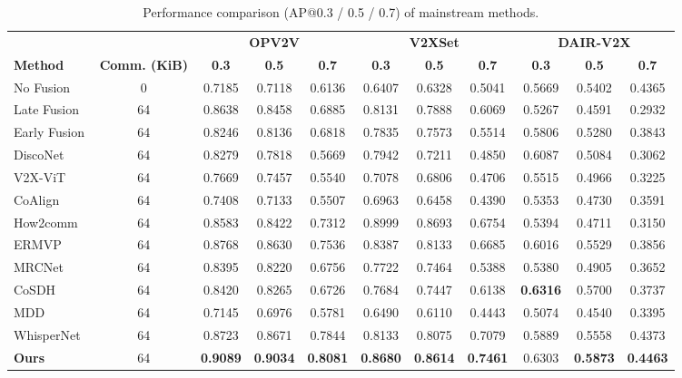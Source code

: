\begin{table}[!t]
\centering
\small
\setlength{\tabcolsep}{4pt}
\caption{Performance comparison (AP@0.3 / 0.5 / 0.7) of mainstream methods.}
\label{tab:main-comparison}
\begin{tabular*}{\textwidth}{@{\extracolsep{\fill}}lcccccccccc@{}}
\toprule
& & \multicolumn{3}{c}{\textbf{OPV2V}} & \multicolumn{3}{c}{\textbf{V2XSet}} & \multicolumn{3}{c}{\textbf{DAIR-V2X}} \\
\cmidrule(lr){3-5}\cmidrule(lr){6-8}\cmidrule(lr){9-11}
\textbf{Method} & \textbf{Comm. (KiB)} & \textbf{0.3} & \textbf{0.5} & \textbf{0.7}
& \textbf{0.3} & \textbf{0.5} & \textbf{0.7} & \textbf{0.3} & \textbf{0.5} & \textbf{0.7} \\
\midrule
No Fusion   & 0      & 0.7185 & 0.7118 & 0.6136 & 0.6407 & 0.6328 & 0.5041 & 0.5669 & 0.5402 & 0.4365 \\
Late Fusion & 64     & 0.8638 & 0.8458 & 0.6885 & 0.8131 & 0.7888 & 0.6069 & 0.5267 & 0.4591 & 0.2932 \\
Early Fusion & 64     & 0.8246 & 0.8136 & 0.6818 & 0.7835 & 0.7573 & 0.5514 & 0.5806 & 0.5280 & 0.3843 \\
\midrule
DiscoNet~\cite{discoNet}     & 64     & 0.8279 & 0.7818 & 0.5669 & 0.7942 & 0.7211 & 0.4850 & 0.6087 & 0.5084 & 0.3062 \\
V2X-ViT~\cite{v2xvit}         & 64     & 0.7669 & 0.7457 & 0.5540 & 0.7078 & 0.6806 & 0.4706 & 0.5515 & 0.4966 & 0.3225 \\
CoAlign~\cite{coalign}         & 64     & 0.7408 & 0.7133 & 0.5507 & 0.6963 & 0.6458 & 0.4390 & 0.5353 & 0.4730 & 0.3591 \\
How2comm~\cite{yang2023how2comm} & 64 & 0.8583 & 0.8422 & 0.7312 & 0.8999 & 0.8693 & 0.6754 & 0.5394 & 0.4711 & 0.3150 \\
ERMVP~\cite{ermvp}           & 64     & 0.8768 & 0.8630 & 0.7536 & 0.8387 & 0.8133 & 0.6685 & 0.6016 & 0.5529 & 0.3856 \\
MRCNet~\cite{mrcnet}           & 64     & 0.8395 & 0.8220 & 0.6756 & 0.7722 & 0.7464 & 0.5388 & 0.5380 & 0.4905 & 0.3652 \\
CoSDH~\cite{cosdh}           & 64     & 0.8420 & 0.8265 & 0.6726 & 0.7684 & 0.7447 & 0.6138 & \textbf{0.6316} & 0.5700 & 0.3737 \\
MDD~\cite{huang2025v2xr}       & 64     & 0.7145 & 0.6976 & 0.5781 & 0.6490 & 0.6110 & 0.4443 & 0.5074 & 0.4540 & 0.3395 \\
WhisperNet~\cite{whispernet} & 64 & 0.8723 & 0.8671 & 0.7844 & 0.8133 & 0.8075 & 0.7079 & 0.5889 & 0.5558 & 0.4373 \\
\midrule
\textbf{Ours} & 64 & \textbf{0.9089} & \textbf{0.9034} & \textbf{0.8081} & \textbf{0.8680} & \textbf{0.8614} & \textbf{0.7461} & 0.6303 & \textbf{0.5873} & \textbf{0.4463} \\
\bottomrule
\end{tabular*}
\end{table}
